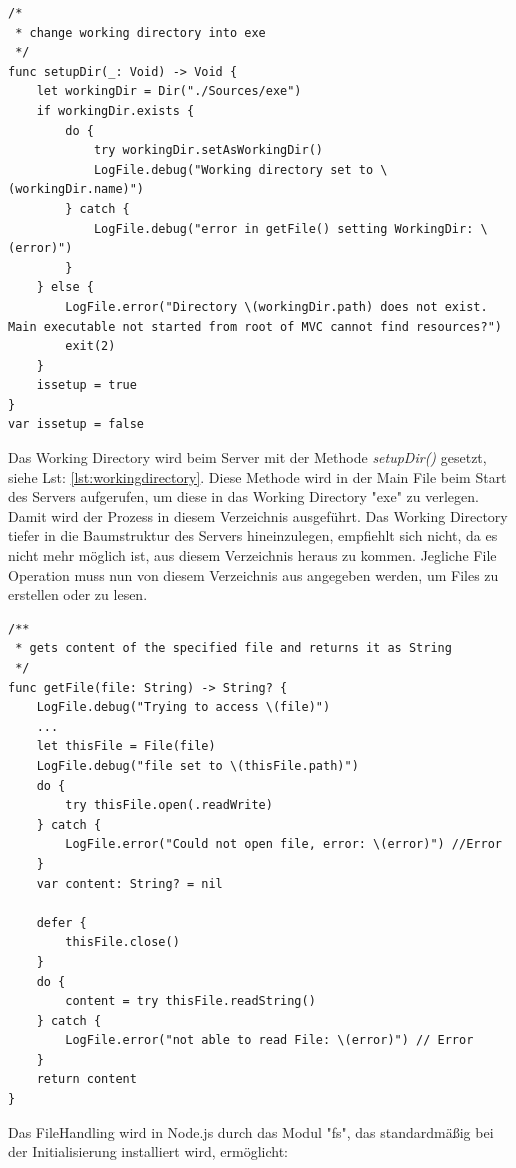 \begin{lstlisting}
/*
 * change working directory into exe
 */
func setupDir(_: Void) -> Void {
    let workingDir = Dir("./Sources/exe")
    if workingDir.exists {
        do {
            try workingDir.setAsWorkingDir()
            LogFile.debug("Working directory set to \(workingDir.name)")
        } catch {
            LogFile.debug("error in getFile() setting WorkingDir: \(error)")
        }
    } else {
        LogFile.error("Directory \(workingDir.path) does not exist. Main executable not started from root of MVC cannot find resources?")
        exit(2)
    }
    issetup = true
}
var issetup = false
\end{lstlisting}

Das Working Directory wird beim Server mit der Methode \textit{setupDir()} gesetzt, siehe Lst: \ref{lst:workingdirectory}. Diese Methode wird in der Main File beim Start des Servers aufgerufen, um diese in das Working Directory "exe" zu verlegen. Damit wird der Prozess in diesem Verzeichnis ausgeführt. Das Working Directory tiefer in die Baumstruktur des Servers hineinzulegen, empfiehlt sich nicht, da es nicht mehr möglich ist, aus diesem Verzeichnis heraus zu kommen. Jegliche File Operation muss nun von diesem Verzeichnis aus angegeben werden, um Files zu erstellen oder zu lesen. 


\begin{lstlisting}
/**
 * gets content of the specified file and returns it as String
 */
func getFile(file: String) -> String? {
    LogFile.debug("Trying to access \(file)")
    ...
    let thisFile = File(file)
    LogFile.debug("file set to \(thisFile.path)")
    do {
        try thisFile.open(.readWrite)
    } catch {
        LogFile.error("Could not open file, error: \(error)") //Error
    }
    var content: String? = nil

    defer {
        thisFile.close()
    }
    do {
        content = try thisFile.readString()
    } catch {
        LogFile.error("not able to read File: \(error)") // Error
    }
    return content
}
\end{lstlisting}

Das FileHandling wird in Node.js durch das Modul "fs", das standardmäßig bei der Initialisierung installiert wird, ermöglicht:


